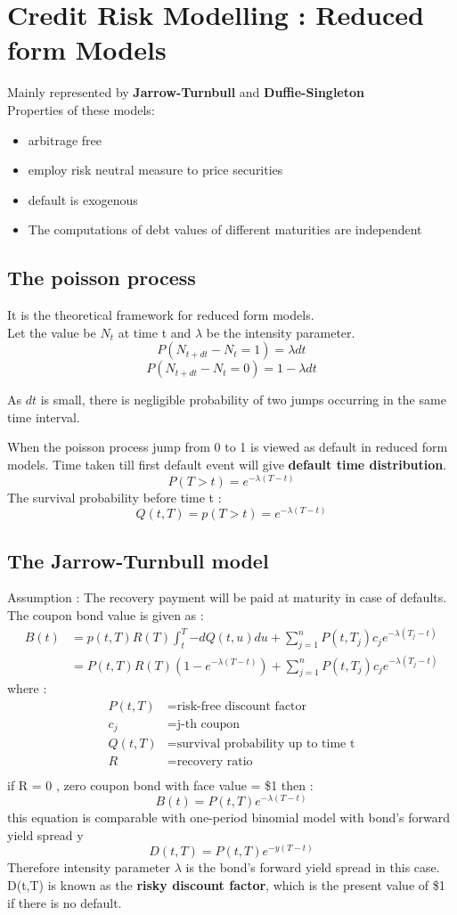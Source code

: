 \chapter{Credit Risk Modelling : Reduced form Models}
Mainly represented by \textbf{Jarrow-Turnbull} and \textbf{Duffie-Singleton}\\
Properties of these models: 
\begin{itemize}
    \item arbitrage free
    \item employ risk neutral measure to price securities
    \item default is exogenous 
    \item The computations of debt values of different maturities are independent
\end{itemize}

\section{The poisson process}
It is the theoretical framework for reduced form models.\\
Let the value be $N_t$ at time t and $\lambda$ be the intensity parameter.
\[ P(N_{t+dt}-N_t=1)=\lambda dt \]
\[ P(N_{t+dt}-N_t=0)=1-\lambda dt \]
 
As $dt$ is small, there is negligible probability of two jumps occurring in the same time interval.

When the poisson process jump from 0 to 1 is viewed as default in reduced form models.
Time taken till first default event will give \textbf{default time distribution}.
\[ P(T>t)=e^{-\lambda(T-t)} \]
The survival probability before time t :
\[Q(t,T)=p(T>t)=e^{-\lambda(T-t)}\]

\section{The Jarrow-Turnbull model}
Assumption : The recovery payment will be paid at maturity in case of defaults.
The coupon bond value is given as : 
\begin{align*}
    B(t)&=p(t,T)R(T)\int_{t}^{T}{-dQ(t,u)du}+\sum_{j=1}^{n}{P(t,T_j)c_je^{-\lambda(T_j-t)}} \\
    &=P(t,T)R(T)(1-e^{-\lambda(T-t)})+\sum_{j=1}^{n}{P(t,T_j)c_je^{-\lambda(T_j-t)}}
\end{align*}
where : \begin{align*}
P(t,T) &= \text{risk-free discount factor} \\
c_j &= \text{j-th coupon} \\
Q(t,T) &= \text{survival probability up to time t} \\
R &= \text{recovery ratio} \\
\end{align*}
if R = 0 , zero coupon bond with face value = \$1 then :
\[B(t)=P(t,T)e^{-\lambda(T-t)}\]
this equation is comparable with one-period binomial model with bond's forward yield spread y
\[D(t,T)=P(t,T)e^{-y(T-t)}\]
Therefore intensity parameter $\lambda$ is the bond's forward yield spread in this case.
D(t,T) is known as the \textbf{risky discount factor},  which is the present value of \$1 if there is no default.

